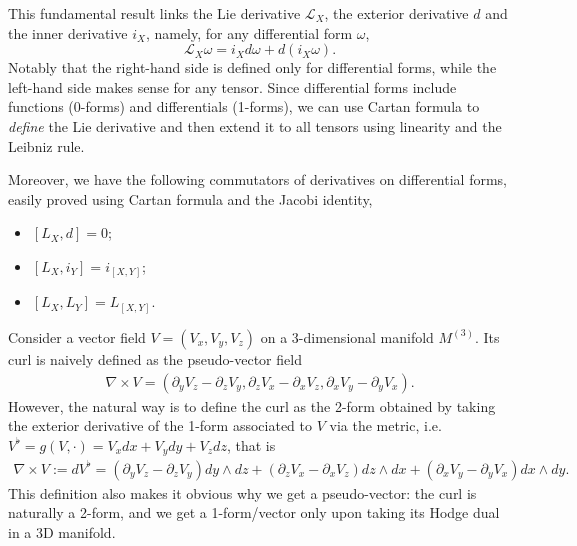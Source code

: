 \documentclass[../geometry_main.tex]{subfiles}
\begin{document}
\begin{mytheorem}
This fundamental result links the Lie derivative $\mathcal{L}_X$, the exterior derivative $d$ and the inner derivative $i_X$, namely, for any differential form $\omega$, 
\begin{equation}
    \mathcal{L}_X \omega = i_X d \omega + d (i_X \omega).
\end{equation}
Notably that the right-hand side is defined only for differential forms, while the left-hand side makes sense for any tensor.
Since differential forms include functions (0-forms) and differentials (1-forms), we can use Cartan formula to \emph{define} the Lie derivative and then extend it to all tensors using linearity and the Leibniz rule.

Moreover, we have the following commutators of derivatives on differential forms, easily proved using Cartan formula and the Jacobi identity,
\begin{itemize}
    \item $[L_X, d]=0$;
    \item $[L_X, i_Y] = i_{[X,Y]}$;
    \item $[L_X, L_Y] = L_{[X,Y]}$.
\end{itemize}
\end{mytheorem}


\begin{mytheorem}
Consider a vector field $V=(V_x,V_y,V_z)$ on a 3-dimensional manifold $M^{(3)}$.
Its curl is naively defined as the pseudo-vector field
\begin{align}
    \nabla \times V= (\partial_y V_z - \partial_z V_y, \partial_z V_x - \partial_x V_z, \partial_x V_y - \partial_y V_x).
\end{align}
However, the natural way is to define the curl as the 2-form obtained by taking the exterior derivative of the 1-form associated to $V$ via the metric, i.e. $V^\flat = g(V,\cdot)= V_x dx + V_y dy + V_z dz$, that is
{\small\begin{align}
    \nabla\times V:=dV^\flat = (\partial_y V_z - \partial_z V_y) dy\wedge dz + (\partial_z V_x - \partial_x V_z) dz\wedge dx + (\partial_x V_y - \partial_y V_x) dx\wedge dy.
\end{align}}
This definition also makes it obvious why we get a pseudo-vector: the curl is naturally a 2-form, and we get a 1-form/vector only upon taking its Hodge dual in a 3D manifold.
\end{mytheorem}
\end{document}
